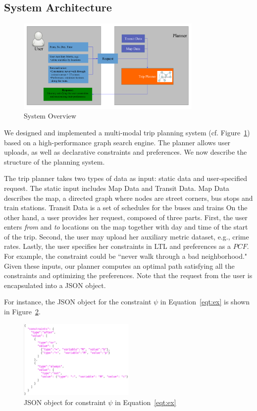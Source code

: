 \documentclass[letterpaper]{article}
\newcommand{\tit}[1]{\textit{#1}}
\newcommand{\PCF}{\mathit{PCF}}
\newcommand{\figref}[1]{Figure~\ref{fig:#1}}
\newcommand{\eqtref}[1]{Equation~\ref{eqt:#1}}
\begin{document}
\subsection{System Architecture}
\begin{figure}[!ht]
  \centering
    \includegraphics[width=0.8\textwidth]{figs/system.pdf}
  \caption{System Overview\label{fig:system}}
\end{figure}
We designed and implemented a multi-modal trip planning
system (cf. \figref{system}) based on a 
high-performance graph search engine.
The planner allows user uploads, as well as declarative
constraints and preferences.
We now describe the structure of the planning system.

The trip planner takes two types of data as input:
static data and user-specified request.
The static input includes Map Data and Transit
Data.
Map Data describes the map, a directed graph where 
nodes are street corners, bus stops and train stations.
Transit Data is a set of schedules for the buses and trains
On the other hand, a user provides her request, composed of 
three parts.
First, the user enters \tit{from} and \tit{to} locations 
on the map together with day and time of the start of the trip.  
Second, the user may upload her auxiliary metric dataset, e.g., crime rates.  
Lastly, the user specifies her constraints in LTL and preferences as a $\PCF$.
For example, the constraint 
could be ``never walk through a bad neighborhood."  Given these 
inputs, our planner computes an optimal path satisfying 
all the constraints and optimizing the preferences.
Note that the request from the user is encapsulated into
a JSON object.

For instance, the JSON object for the constraint $\psi$ in \eqtref{ex}
is shown in \figref{exJSON}.
\begin{figure}[!ht]
  \centering
    \includegraphics[width=0.5\textwidth]{figs/exampleJSON.png}
  \caption{JSON object for constraint $\psi$ in \eqtref{ex}\label{fig:exJSON}}
\end{figure}
\end{document}
